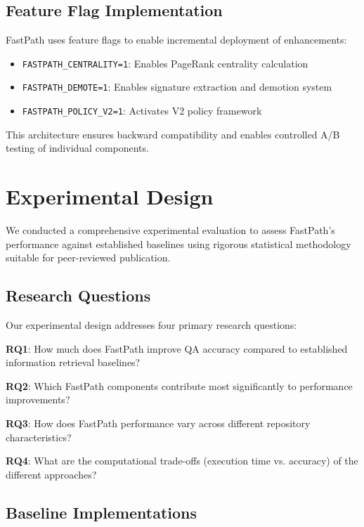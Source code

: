 \documentclass[conference]{IEEEtran}
\begin{document}
\subsection{Feature Flag Implementation}

FastPath uses feature flags to enable incremental deployment of enhancements:

\begin{itemize}
\item \texttt{FASTPATH\_CENTRALITY=1}: Enables PageRank centrality calculation
\item \texttt{FASTPATH\_DEMOTE=1}: Enables signature extraction and demotion system
\item \texttt{FASTPATH\_POLICY\_V2=1}: Activates V2 policy framework
\end{itemize}

This architecture ensures backward compatibility and enables controlled A/B testing of individual components.

\section{Experimental Design}

We conducted a comprehensive experimental evaluation to assess FastPath's performance against established baselines using rigorous statistical methodology suitable for peer-reviewed publication.

\subsection{Research Questions}

Our experimental design addresses four primary research questions:

\textbf{RQ1}: How much does FastPath improve QA accuracy compared to established information retrieval baselines?

\textbf{RQ2}: Which FastPath components contribute most significantly to performance improvements?

\textbf{RQ3}: How does FastPath performance vary across different repository characteristics?

\textbf{RQ4}: What are the computational trade-offs (execution time vs. accuracy) of the different approaches?

\subsection{Baseline Implementations}
\end{document}
